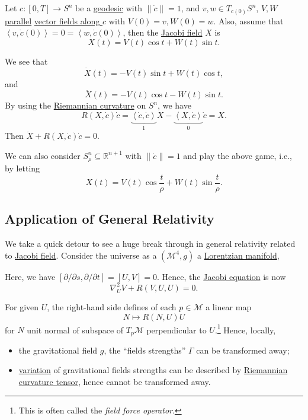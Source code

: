\begin{eg}
	Let \(c\colon [0, T] \to S^n\) be a \hyperref[def:geodesic]{geodesic} with \(\lVert \dot{c} \rVert = 1\), and \(v, w\in T_{c(0)}S^n\), \(V, W\) \hyperref[def:parallel]{parallel} \hyperref[def:vector-field-along-curve]{vector fields along \(c\)} with \(V(0) = v, W(0) = w\). Also, assume that \(\left\langle v, \dot{c} (0) \right\rangle = 0 = \left\langle w, \dot{c} (0) \right\rangle \), then the \hyperref[def:Jacobi-field]{Jacobi field} \(X\) is
	\[
		X(t) = V(t) \cos t + W(t) \sin t.
	\]
\end{eg}
\begin{explanation}
	We see that
	\[
		\dot{X}(t) = -V(t) \sin t + W(t) \cos t,
	\]
	and
	\[
		\ddot{X}(t) = -V(t)\cos t - W(t) \sin t.
	\]
	By using the \hyperref[def:Riemannian-curvature]{Riemannian curvature} on \(S^n\), we have
	\[
		R(X, \dot{c} )\dot{c}
		= \underbrace{\left\langle \dot{c}, \dot{c} \right\rangle}_{1} X - \underbrace{\left\langle X, \dot{c} \right\rangle }_{0} \dot{c}
		= X.
	\]
	Then \(\ddot{X} + R(X, \dot{c} )\dot{c} = 0\).
\end{explanation}

\begin{remark}
	We can also consider \(S^n_{\rho } \subseteq \mathbb{R} ^{n+1}\) with \(\lVert \dot{c} \rVert = 1\) and play the above game, i.e., by letting
	\[
		X(t) = V(t) \cos \frac{t}{\rho } + W(t) \sin \frac{t}{\rho }.
	\]
\end{remark}

\subsection{Application of General Relativity}
We take a quick detour to see a huge break through in general relativity related to \hyperref[def:Jacobi-field]{Jacobi field}. Consider the universe as a \((\mathcal{M} ^4, g)\) a \hyperref[def:Lorentzian-metric]{Lorentzian manifold},
\begin{center}
\end{center}

Here, we have \([\partial / \partial s, \partial / \partial t] = [U, V] = 0 \). Hence, the \hyperref[eq:Jacobi]{Jacobi equation} is now
\[
	\nabla ^2_U V + R(V, U, U) = 0.
\]

For given \(U\), the right-hand side defines of each \(p\in \mathcal{M} \) a linear map
\[
	N \mapsto R(N, U)U
\]
for \(N\) unit normal of subspace of \(T_p \mathcal{M} \) perpendicular to \(U\).\footnote{This is often called the \emph{field force operator}.} Hence, locally,
\begin{itemize}
	\item the gravitational field \(g\), the ``fields strengths'' \(\Gamma \) can be transformed away;
	\item \hyperref[prev:variation]{variation} of gravitational fields strengths can be described by \hyperref[def:Riemannian-curvature]{Riemannian curvature tensor}, hence cannot be transformed away.
\end{itemize}

